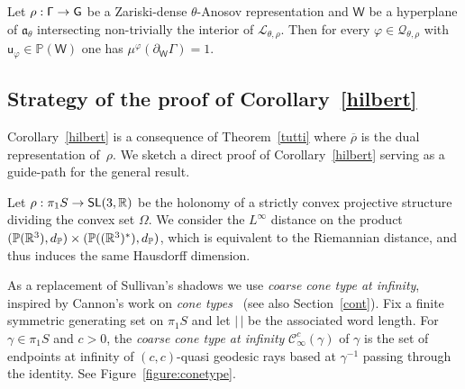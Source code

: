 \documentclass[AHL,Unicode,longabstracts,MathTools]{cedram}
\DeclareMathOperator{\SL}{{\mathsf{SL}}}
\renewcommand{\sf}[1]{{\mathsf{#1}}}
\newcommand{\sfG}{\sf{G}}
\newcommand{\G}{\sf{\Gamma}}
\newcommand{\cal}{\mathcal}
\newcommand{\cone}{\cal{C}}
\newcommand{\calL}{\mathcal{L}}
\newcommand{\calQ}{\mathcal{Q}}
\newcommand{\R}{\mathbb{R}}
\renewcommand{\P}{\mathbb{P}}
\newcommand{\g}{\gamma}
\renewcommand{\t}{\theta}
\newcommand{\bord}{\partial}
\newcommand{\piS}{\pi_1S}
\newcommand{\ovrho}{\overline{\!\rho}}
\renewcommand{\/}{\backslash}
\newcommand{\<}{\langle}
\renewcommand{\>}{\rangle}
\renewcommand{\a}{\mathfrak{a}}
\renewcommand*{\to}{\mathchoice{\longrightarrow}{\rightarrow}{\rightarrow}{\rightarrow}}
\begin{document}
\begin{theo}\label{Ahyper}
Let $\rho:\G\to\sfG$ be a Zariski-dense $\t$-Anosov representation and $\sf W$ be a hyperplane of $\a_\t$ intersecting non-trivially the interior of $\calL_{\t,\rho}$. Then for every $\varphi\in\calQ_{\t,\rho}$ with $\sf u_\varphi\in\P(\sf W)$ one has $\mu^\varphi(\bord_\sf W\G)=1$.
\end{theo}



\subsection{Strategy of the proof of Corollary~\ref{hilbert}}\label{specialcases}
\label{corAProof}
Corollary~\ref{hilbert} is a consequence of Theorem~\ref{tutti} where $\ovrho$ is the dual representation of~$\rho$. We sketch a direct proof of Corollary~\ref{hilbert} serving as a guide-path for the general result.


Let $\rho:\piS\to\SL(3,\R)$ be the holonomy of a strictly convex projective structure dividing the convex set $\Omega$. We consider the $L^\infty$ distance on the product $(\P(\R^3), d_\P)\times\linebreak(\P((\R^3)^*),d_{\P})$, which is equivalent to the Riemannian distance, and thus induces the same Hausdorff dimension.


As a replacement of Sullivan's shadows we use \emph{coarse cone type at infinity}, inspired by Cannon's work on \emph{cone types}~\cite{CannonCones} (see also Section~\ref{cont}). Fix a finite symmetric generating set on $\piS$ and let $|\,|$ be the associated word length. For $\g\in\piS$ and $c>0$, the \emph{coarse cone type at infinity} $\cone^{c}_\infty(\g)$ of $\gamma$ is the set of endpoints at infinity of $(c,c)$-quasi geodesic rays based at $\g^{-1}$ passing through the identity. See Figure~\ref{figure:conetype}.
\end{document}
